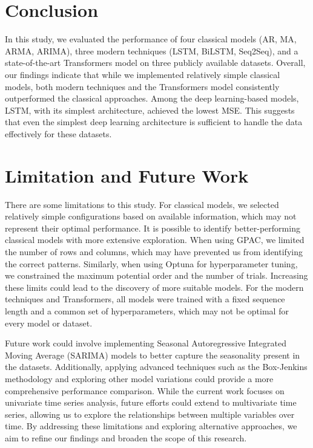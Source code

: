 \documentclass[sn-mathphys-num]{sn-jnl}
\theoremstyle{thmstyleone}%
\theoremstyle{thmstyletwo}%
\theoremstyle{thmstylethree}%
\begin{document}
\section{Conclusion}
In this study, we evaluated the performance of four classical models (AR, MA, ARMA, ARIMA), three modern techniques (LSTM, BiLSTM, Seq2Seq), and a state-of-the-art Transformers model on three publicly available datasets. Overall, our findings indicate that while we implemented relatively simple classical models, both modern techniques and the Transformers model consistently outperformed the classical approaches. Among the deep learning-based models, LSTM, with its simplest architecture, achieved the lowest MSE. This suggests that even the simplest deep learning architecture is sufficient to handle the data effectively for these datasets.


\section{Limitation and Future Work}
There are some limitations to this study. For classical models, we selected relatively simple configurations based on available information, which may not represent their optimal performance. It is possible to identify better-performing classical models with more extensive exploration. When using GPAC, we limited the number of rows and columns, which may have prevented us from identifying the correct patterns. Similarly, when using Optuna for hyperparameter tuning, we constrained the maximum potential order and the number of trials. Increasing these limits could lead to the discovery of more suitable models. For the modern techniques and Transformers, all models were trained with a fixed sequence length and a common set of hyperparameters, which may not be optimal for every model or dataset.

Future work could involve implementing Seasonal Autoregressive Integrated Moving Average (SARIMA) models \cite{box2015time} to better capture the seasonality present in the datasets. Additionally, applying advanced techniques such as the Box-Jenkins methodology \cite{box2015time} and exploring other model variations could provide a more comprehensive performance comparison. While the current work focuses on univariate time series analysis, future efforts could extend to multivariate time series, allowing us to explore the relationships between multiple variables over time. By addressing these limitations and exploring alternative approaches, we aim to refine our findings and broaden the scope of this research.





\end{document}
